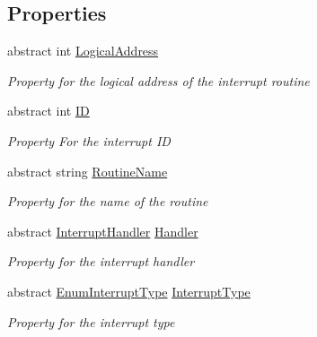 \subsection*{Properties}
\begin{DoxyCompactItemize}
\item 
abstract int \hyperlink{class_c_p_u___o_s___simulator_1_1_c_p_u_1_1_interrupts_1_1_interrupt_a5d863371dc3db28878f8f818cdd003fc}{Logical\+Address}
\begin{DoxyCompactList}\small\item\em Property for the logical address of the interrupt routine \end{DoxyCompactList}\item 
abstract int \hyperlink{class_c_p_u___o_s___simulator_1_1_c_p_u_1_1_interrupts_1_1_interrupt_a8974e3bbe2504027b3a4f8aa64496c11}{I\+D}
\begin{DoxyCompactList}\small\item\em Property For the interrupt I\+D \end{DoxyCompactList}\item 
abstract string \hyperlink{class_c_p_u___o_s___simulator_1_1_c_p_u_1_1_interrupts_1_1_interrupt_a71517440db47453739db9398108b5b74}{Routine\+Name}
\begin{DoxyCompactList}\small\item\em Property for the name of the routine \end{DoxyCompactList}\item 
abstract \hyperlink{class_c_p_u___o_s___simulator_1_1_c_p_u_1_1_interrupts_1_1_interrupt_handler}{Interrupt\+Handler} \hyperlink{class_c_p_u___o_s___simulator_1_1_c_p_u_1_1_interrupts_1_1_interrupt_a7d95dcc2cb3e77723328b64172eddeae}{Handler}
\begin{DoxyCompactList}\small\item\em Property for the interrupt handler \end{DoxyCompactList}\item 
abstract \hyperlink{namespace_c_p_u___o_s___simulator_1_1_c_p_u_1_1_interrupts_a575a43213ed6d54083da8956c5a69b39}{Enum\+Interrupt\+Type} \hyperlink{class_c_p_u___o_s___simulator_1_1_c_p_u_1_1_interrupts_1_1_interrupt_acb3df6a95e1ae7a8d389e84161288a1b}{Interrupt\+Type}
\begin{DoxyCompactList}\small\item\em Property for the interrupt type \end{DoxyCompactList}\end{DoxyCompactItemize}


